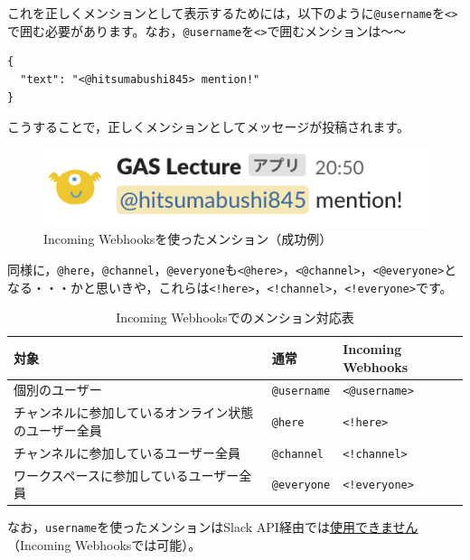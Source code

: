 \documentclass[uplatex,a4j]{jsarticle}
\begin{document}
これを正しくメンションとして表示するためには，以下のように\verb|@username|を\verb|<>|で囲む必要があります。なお，\verb|@username|を\verb|<>|で囲むメンションは〜〜

\begin{lstlisting}[basicstyle=\ttfamily\footnotesize,frame=single,caption=mention payload sample2,label=mrkdwnpayload]
{
  "text": "<@hitsumabushi845> mention!"
}
\end{lstlisting}

こうすることで，正しくメンションとしてメッセージが投稿されます。

\begin{figure}[H]
 \centering
 \includegraphics[keepaspectratio, scale=0.8]{images/mention2.png}
 \caption{Incoming Webhooksを使ったメンション（成功例）}
 \label{fig:mention2}
\end{figure}

同様に，\verb|@here|，\verb|@channel|，\verb|@everyone|も\verb|<@here>|，\verb|<@channel>|，\verb|<@everyone>|となる・・・かと思いきや，これらは\verb|<!here>|，\verb|<!channel>|，\verb|<!everyone>|です。

\begin{table}[H]
  \caption{Incoming Webhooksでのメンション対応表}
  \centering
  \begin{tabular}{l|ll}
対象 & 通常 & Incoming Webhooks \\ \hline
個別のユーザー & \verb|@username| & \verb|<@username>| \\
チャンネルに参加しているオンライン状態のユーザー全員 & \verb|@here| & \verb|<!here>| \\
チャンネルに参加しているユーザー全員 & \verb|@channel| & \verb|<!channel>| \\
ワークスペースに参加しているユーザー全員\footnotemark & \verb|@everyone| & \verb|<!everyone>| \\
  \end{tabular}
\end{table}


なお，\verb|username|を使ったメンションはSlack API経由では\href{https://api.slack.com/changelog/2017-09-the-one-about-usernames}{使用できません}（Incoming Webhooksでは可能）。
\end{document}
